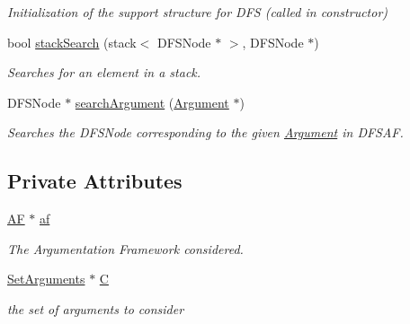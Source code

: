 \begin{DoxyCompactItemize}
\begin{DoxyCompactList}\small\item\em Initialization of the support structure for D\-F\-S (called in constructor) \end{DoxyCompactList}\item 
bool \hyperlink{classPreferred_a9a619edb7db3960d8f86c92538488a33}{stack\-Search} (stack$<$ D\-F\-S\-Node $\ast$ $>$, D\-F\-S\-Node $\ast$)
\begin{DoxyCompactList}\small\item\em Searches for an element in a stack. \end{DoxyCompactList}\item 
D\-F\-S\-Node $\ast$ \hyperlink{classPreferred_a2647e7beb57edc3b9b8c5966a69b5f81}{search\-Argument} (\hyperlink{classArgument}{Argument} $\ast$)
\begin{DoxyCompactList}\small\item\em Searches the D\-F\-S\-Node corresponding to the given \hyperlink{classArgument}{Argument} in D\-F\-S\-A\-F. \end{DoxyCompactList}\end{DoxyCompactItemize}
\subsection*{Private Attributes}
\begin{DoxyCompactItemize}
\item 
\hypertarget{classPreferred_a8d0d12e32a4950a77edff0f8751a65b9}{\hyperlink{classAF}{A\-F} $\ast$ \hyperlink{classPreferred_a8d0d12e32a4950a77edff0f8751a65b9}{af}}\label{classPreferred_a8d0d12e32a4950a77edff0f8751a65b9}

\begin{DoxyCompactList}\small\item\em The Argumentation Framework considered. \end{DoxyCompactList}\item 
\hypertarget{classPreferred_a25df148cc2682a163261b532dc3b60d5}{\hyperlink{classSetArguments}{Set\-Arguments} $\ast$ \hyperlink{classPreferred_a25df148cc2682a163261b532dc3b60d5}{C}}\label{classPreferred_a25df148cc2682a163261b532dc3b60d5}

\begin{DoxyCompactList}\small\item\em the set of arguments to consider \end{DoxyCompactList}\end{DoxyCompactItemize}


